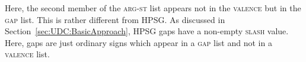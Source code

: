 \documentclass[output=paper
                ,modfonts
                ,nonflat
	        ,collection
	        ,collectionchapter
	        ,collectiontoclongg
 	        ,biblatex
                ,babelshorthands
                ,newtxmath
                ,draftmode
                ,colorlinks, citecolor=brown
]{./langsci/langscibook}
\begin{document}
{\begin{exe}
\end{exe}
	
\noindent
Here, the second member of the \textsc{arg-st} list appears not in the \textsc{valence} but in the \textsc{gap} list. This is rather different from HPSG. As discussed in Section~\ref{sec:UDC:BasicApproach}, HPSG gaps have a non-empty \textsc{slash} value. Here, gaps are just ordinary signs which appear in a \textsc{gap} list and not in a \textsc{valence} list.










    





 

{\sloppy
\printbibliography[heading=subbibliography,notkeyword=this]
}


}
\end{document}
